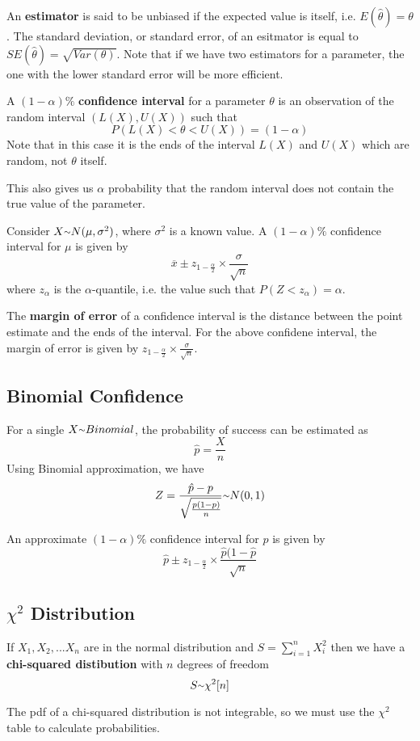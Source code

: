 \documentclass[12pt]{article}
\begin{document}
An {\bf estimator} is said to be unbiased if the expected value is itself, i.e. $E(\hat{\theta}) = \theta$. The standard deviation, or standard error, of an esitmator is equal to $SE(\hat{\theta}) = \sqrt{Var(\theta)}$. Note that if we have two estimators for a parameter, the one with the lower standard error will be more efficient.

A $(1 - \alpha)\%$ {\bf confidence interval} for a parameter $\theta$ is an observation of the random interval $(L(X), U(X))$ such that \[ P(L(X) < \theta < U(X)) = (1 - \alpha) \] Note that in this case it is the ends of the interval $L(X)$ and $U(X)$ which are random, not $\theta$ itself.

This also gives us $\alpha$ probability that the random interval does not contain the true value of the parameter.

Consider $X \ttilde N(\mu, \sigma^2)$, where $\sigma^2$ is a known value. A $(1 - \alpha)\%$ confidence interval for $\mu$ is given by \[ \overline{x} \pm z_{1 - \frac{\alpha}{2}} \times \frac{\sigma}{\sqrt{n}} \] where $z_\alpha$ is the $\alpha$-quantile, i.e. the value such that $P(Z < z_\alpha) = \alpha$.

The {\bf margin of error} of a confidence interval is the distance between the point estimate and the ends of the interval. For the above confidene interval, the margin of error is given by $z_{1 - \frac{\alpha}{2}} \times \frac{\sigma}{\sqrt{n}}$.

\subsection*{Binomial Confidence}
For a single $X \ttilde Binomial$, the probability of success can be estimated as \[ \hat{p} = \frac{X}{n} \] Using Binomial approximation, we have \[ Z = \frac{\hat{p} - p}{\sqrt{\frac{p(1-p)}{n}}} \ttilde N(0,1) \]

An approximate $(1 - \alpha)\%$ confidence interval for $p$ is given by \[ \hat{p} \pm z_{1 - \frac{\alpha}{2}} \times \frac{\hat{p}(1 - \hat{p}}{\sqrt{n}} \]

\subsection*{$\chi^2$ Distribution}
If $X_1, X_2, ... X_n$ are in the normal distribution and $S = \displaystyle\sum_{i=1}^n X_i^2$ then we have a {\bf chi-squared distibution} with $n$ degrees of freedom \[ S \ttilde \chi^2[n] \]

The pdf of a chi-squared distribution is not integrable, so we must use the $\chi^2$ table to calculate probabilities.
\end{document}
